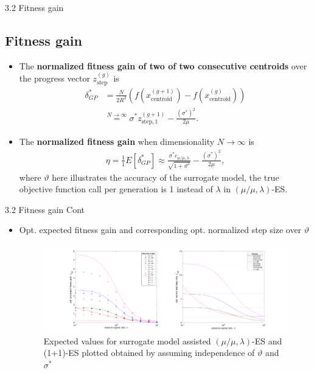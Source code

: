 \documentclass{beamer}
\begin{document}
\begin{frame}{3.2 Fitness gain}
\subsection{Fitness gain}
\begin{itemize}
    \item The \textbf{normalized fitness gain of two of two consecutive centroids} over the progress vector $z_{\text{step}}^{(g)}$ is
    \begin{align}
        \delta_{GP}^* &=  \frac{N}{2R^2}\left( f( x_{\text{centroid}}^{(g+1)} ) - f( x_{\text{centroid}}^{(g)} ) \right)  \nonumber\\ 
        &\overset{N \rightarrow \infty}{=} \sigma^* z_{\text{step},1}^{(g+1)}   - \frac{(\sigma^*)^2}{2 \mu}.\nonumber  
    \end{align}
    \item The \textbf{normalized fitness gain} when dimensionality $N \rightarrow \infty$ is 
    \begin{align}\label{eqn:eta_surrogate}{}
        \eta = \frac{1}{1}E[ \delta_{GP}^*] \approx  \frac{\sigma^* c_{\mu / \mu, \lambda}}{\sqrt {1+ \vartheta^2}} - \frac{(\sigma^*)^2}{2 \mu} ,\nonumber 
    \end{align}
    where $\vartheta$ here illustrates the accuracy of the surrogate model, the true objective function call per generation is 1 instead of $\lambda$ in $(\mu/\mu,\lambda)$-ES.
\end{itemize} 

\end{frame}

\begin{frame}{3.2 Fitness gain Cont}
\begin{itemize}
    \item Opt. expected fitness gain and corresponding opt. normalized step size over $\vartheta$


\begin{figure}
\includegraphics[width=1.0\linewidth]{opt_stepSize_fitGain_final.pdf}
    \caption{Expected values for surrogate model assisted $(\mu/\mu,\lambda)$-ES and (1+1)-ES plotted obtained by assuming independence of $\vartheta$ and $\sigma^*$}
\end{figure}
\end{itemize} 
\end{frame}
\end{document}
